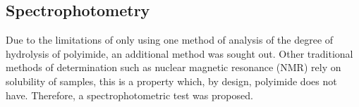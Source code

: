 \subsection{Spectrophotometry}


Due to the limitations of only using one method of analysis of the degree of hydrolysis of polyimide, an additional method was sought out. Other traditional methods of determination such as nuclear magnetic resonance (NMR) rely on solubility of samples, this is a property which, by design, polyimide does not have. Therefore, a spectrophotometric test was proposed.









